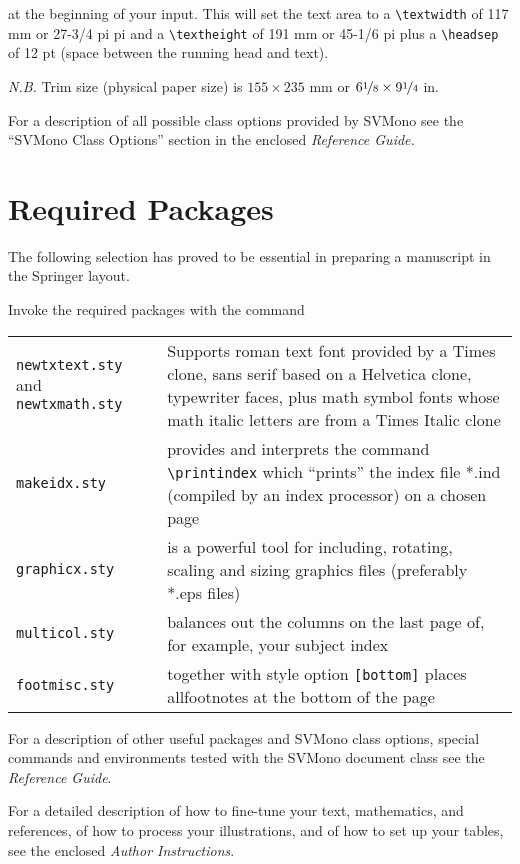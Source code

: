 \documentclass[graybox]{svmono}
\begin{document}
\begin{sloppy}
at the beginning of your input. This will set the text area to a \verb|\textwidth|
of 117 mm or 27-3/4 pi pi and a \verb|\textheight| of 191 mm or 45-1/6 pi plus a
\verb|\headsep| of 12 pt (space between the running head and text).

{\it N.B.} Trim size (physical paper size) is $155 \times 235$ mm or $6\nicefrac{1}{8} \times 9\nicefrac{1}{4}$ in.

For a description of all possible class options provided by {\sc SVMono} see the
``{\sc SVMono} Class Options'' section in the enclosed {\it Reference Guide.}

\section{Required Packages}

The following selection has proved to be essential in preparing a manuscript in
the Springer layout.

Invoke the required packages with the command

\cprotect\boxtext{\verb|\usepackage{}|}

\begin{tabular}{p{7.5pc}@{\qquad}p{18.5pc}}
{\tt newtxtext.sty} and {\tt newtxmath.sty} & Supports roman text font provided by a Times clone,  sans serif based on a Helvetica clone,  typewriter faces,  plus math symbol fonts whose math italic letters are from a Times Italic clone\\
{\tt makeidx.sty} &  provides  and interprets the command  \verb|\printindex|  which ``prints'' the index file *.ind (compiled by an index processor) on a chosen page\\
{\tt graphicx.sty} & is a powerful tool for including, rotating, scaling and sizing graphics files (preferably *.eps files)\\
{\tt multicol.sty} & balances out the columns on the last page of, for example, your subject index\\
{\tt footmisc.sty}  & together with style option {\tt [bottom]} places all\break footnotes at the bottom of the page
\end{tabular}

For a description of other useful packages and {\sc SVMono} class options, special commands and environments tested with the {\sc SVMono} document class see the {\it Reference Guide}.

For a detailed description of how to fine-tune your text, mathematics, and references, of how to process your illustrations, and of how to set up your tables, see the enclosed {\it Author Instructions}.



\end{sloppy}
\end{document}
